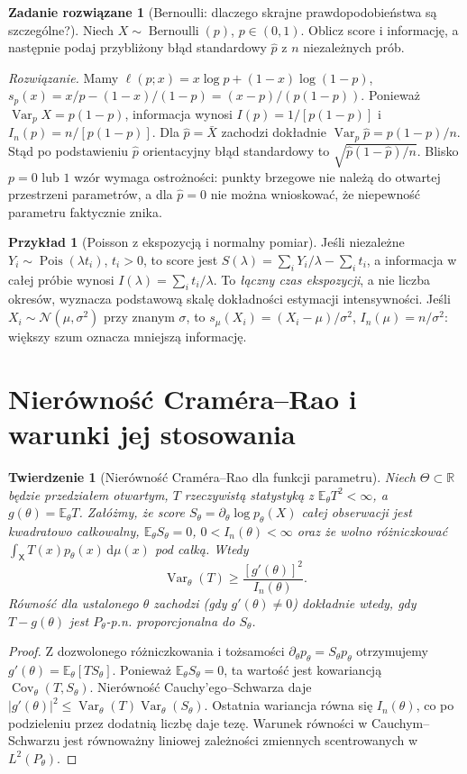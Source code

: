 \documentclass[11pt,a4paper,oneside]{report}
\numberwithin{equation}{chapter}
\theoremstyle{plain}
\newtheorem{twierdzenie}{Twierdzenie}[chapter]
\theoremstyle{definition}
\newtheorem{przyklad}{Przykład}[chapter]
\newtheorem{zadanie}{Zadanie rozwiązane}[chapter]
\theoremstyle{remark}
\newcommand{\R}{\mathbb R}
\newcommand{\E}{\mathbb E}
\newcommand{\Var}{\operatorname{Var}}
\newcommand{\Cov}{\operatorname{Cov}}
\newcommand{\dd}{\mathrm d}
\newcommand{\Normal}{\mathcal N}
\begin{document}
\begin{zadanie}[Bernoulli: dlaczego skrajne prawdopodobieństwa są szczególne?]
Niech $X\sim\operatorname{Bernoulli}(p)$, $p\in(0,1)$.
Oblicz score i informację, a następnie podaj przybliżony
błąd standardowy $\widehat p$ z $n$ niezależnych prób.
\par\emph{Rozwiązanie.} Mamy
$\ell(p;x)=x\log p+(1-x)\log(1-p)$,
$s_p(x)=x/p-(1-x)/(1-p)=(x-p)/(p(1-p))$.
Ponieważ $\Var_p X=p(1-p)$, informacja wynosi
$I(p)=1/[p(1-p)]$ i $I_n(p)=n/[p(1-p)]$.
Dla $\widehat p=\bar X$ zachodzi dokładnie
$\Var_p\widehat p=p(1-p)/n$. Stąd po podstawieniu
$\widehat p$ orientacyjny błąd standardowy to
$\sqrt{\widehat p(1-\widehat p)/n}$.
Blisko $p=0$ lub $1$ wzór wymaga ostrożności: punkty brzegowe
nie należą do otwartej przestrzeni parametrów, a dla $\widehat p=0$
nie można wnioskować, że niepewność parametru faktycznie znika.
\end{zadanie}

\begin{przyklad}[Poisson z ekspozycją i normalny pomiar]
Jeśli niezależne $Y_i\sim\operatorname{Pois}(\lambda t_i)$,
$t_i>0$, to score jest $S(\lambda)=\sum_iY_i/\lambda-
\sum_it_i$, a informacja w całej próbie wynosi
$I(\lambda)=\sum_it_i/\lambda$. To \emph{łączny czas ekspozycji},
a nie liczba okresów, wyznacza podstawową skalę dokładności
estymacji intensywności. Jeśli $X_i\sim\Normal(\mu,\sigma^2)$
przy znanym $\sigma$, to $s_\mu(X_i)=(X_i-\mu)/\sigma^2$,
$I_n(\mu)=n/\sigma^2$: większy szum oznacza mniejszą informację.
\end{przyklad}

\section{Nierówność Craméra--Rao i warunki jej stosowania}
\begin{twierdzenie}[Nierówność Craméra--Rao dla funkcji parametru]
\label{thm:cramer-rao}
Niech $\Theta\subset\R$ będzie przedziałem otwartym,
$T$ rzeczywistą statystyką z $\E_\theta T^2<\infty$,
a $g(\theta)=\E_\theta T$. Załóżmy, że score
$S_\theta=\partial_\theta\log p_\theta(X)$ całej obserwacji
jest kwadratowo całkowalny, $\E_\theta S_\theta=0$,
$0<I_n(\theta)<\infty$ oraz że wolno różniczkować
$\int_{\mathsf X} T(x)p_\theta(x)\,\dd\mu(x)$ pod całką. Wtedy
\[
\Var_\theta(T)\ge\frac{[g'(\theta)]^2}{I_n(\theta)}.
\]
Równość dla ustalonego $\theta$ zachodzi (gdy $g'(\theta)\ne0$)
dokładnie wtedy, gdy $T-g(\theta)$ jest $P_\theta$-p.n.
proporcjonalna do $S_\theta$.
\end{twierdzenie}
\begin{proof}
Z dozwolonego różniczkowania i tożsamości
$\partial_\theta p_\theta=S_\theta p_\theta$ otrzymujemy
$g'(\theta)=\E_\theta[T S_\theta]$.
Ponieważ $\E_\theta S_\theta=0$, ta wartość jest kowariancją
$\Cov_\theta(T,S_\theta)$. Nierówność Cauchy'ego--Schwarza
daje $|g'(\theta)|^2\le\Var_\theta(T)\Var_\theta(S_\theta)$.
Ostatnia wariancja równa się $I_n(\theta)$, co po podzieleniu
przez dodatnią liczbę daje tezę. Warunek równości w
Cauchym--Schwarzu jest równoważny liniowej zależności
zmiennych scentrowanych w $L^2(P_\theta)$.
\end{proof}
\end{document}
